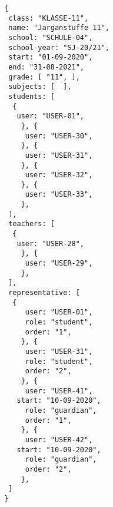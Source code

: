 
\begin{lstlisting}[caption={Klassen Datenmodel Beispiel 2: Jagangstuffe 11, Seundarstuffe 2},frame=tlrb]
{
 class: "KLASSE-11",
 name: "Jarganstuffe 11",
 school: "SCHULE-04",
 school-year: "SJ-20/21",
 start: "01-09-2020",
 end: "31-08-2021",
 grade: [ "11", ],
 subjects: [  ],
 students: [
  { 
   user: "USER-01",
	}, { 
	 user: "USER-30",
	}, { 
	 user: "USER-31",
	}, { 
	 user: "USER-32",
	}, { 
	 user: "USER-33",
	},
 ],
 teachers: [
  { 
   user: "USER-28",
	}, { 
	 user: "USER-29",
	},
 ],
 representative: [
  {
	 user: "USER-01",
	 role: "student",
	 order: "1",	 
	}, {
	 user: "USER-31",
	 role: "student",
	 order: "2",	 
	}, {
	 user: "USER-41",
   start: "10-09-2020",
	 role: "guardian",
	 order: "1",	 
	}, {
	 user: "USER-42",
   start: "10-09-2020",
	 role: "guardian",
	 order: "2",	 
	},  
 ]
}
\end{lstlisting}